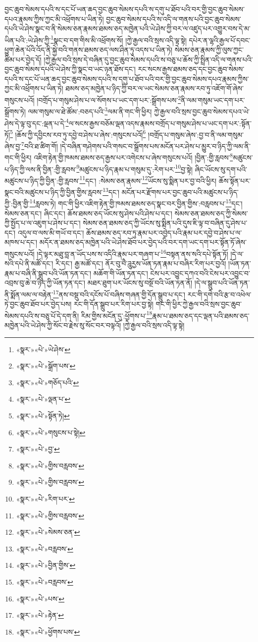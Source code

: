 བྱང་ཆུབ་སེམས་དཔའི་ས་དང་པོ་ཡན་ཆད་བྱང་ཆུབ་སེམས་དཔའི་ས་དགུ་པ་ཐོབ་པའི་བར་གྱི་བྱང་ཆུབ་སེམས་དཔའ་རྣམས་ཀྱིས་ཀྱང་མི་འཕྲོགས་པ་ཡིན་ཏེ། བྱང་ཆུབ་སེམས་དཔའི་ས་འདི་ལ་གནས་པའི་བྱང་ཆུབ་སེམས་དཔའི་ཡེ་ཤེས་སྣང་བ་ནི་སེམས་ཅན་རྣམས་ཐམས་ཅད་མཁྱེན་པའི་ཡེ་ཤེས་ཀྱི་བར་ལ་འཛུད་པར་འགྱུར་བས་དེ་མ་ཡིན་པའི་:ཡེ་ཤེས་ཀྱི་\footnote{«སྣར་»«པེ་»ཡེ་ཤེས་}སྣང་བ་དག་གིས་མི་འཕྲོགས་སོ། །ཀྱེ་རྒྱལ་བའི་སྲས་འདི་ལྟ་སྟེ། དཔེར་ན་ལྷའི་རྒྱལ་པོ་དབང་ཕྱུག་ཆེན་པོའི་འོད་ནི་སྐྱེ་བའི་གནས་ཐམས་ཅད་ལས་ཤིན་ཏུ་འདས་པ་ཡིན་ཏེ། སེམས་ཅན་རྣམས་ཀྱི་ལུས་ཀྱང་ཚིམ་པར་བྱེད་དོ། །ཀྱེ་རྒྱལ་བའི་སྲས་དེ་བཞིན་དུ་བྱང་ཆུབ་སེམས་དཔའི་ས་བཅུ་པ་ཆོས་ཀྱི་སྤྲིན་འདི་ལ་གནས་པའི་བྱང་ཆུབ་སེམས་དཔའི་ཡེ་ཤེས་ཀྱི་སྣང་བ་ཡང་ཉན་ཐོས་དང་། རང་སངས་རྒྱས་ཐམས་ཅད་དང་བྱང་ཆུབ་སེམས་དཔའི་ས་དང་པོ་ཡན་ཆད་བྱང་ཆུབ་སེམས་དཔའི་ས་དགུ་པ་ཐོབ་པའི་བར་གྱི་བྱང་ཆུབ་སེམས་དཔའ་རྣམས་ཀྱིས་ཀྱང་མི་འཕྲོགས་པ་ཡིན་ཏེ། ཐམས་ཅད་མཁྱེན་པ་ཉིད་ཀྱི་བར་ལ་ཡང་སེམས་ཅན་རྣམས་རབ་ཏུ་འཇོག་གོ་ཞེས་གསུངས་པའོ། །བགྲོད་པ་གསུམ་ཤེས་པ་ལ་སོགས་པ་ཡང་དག་པར་:སྒྲོགས་པས་\footnote{«སྣར་»«པེ་»སྒྲོག་པས་}ནི་ལམ་གསུམ་ཡང་དག་པར་སྒྲོགས་ཏེ། ལམ་གསུམ་ལ་ཐེ་ཚོམ་:བཅད་པའི་\footnote{«སྣར་»«པེ་»གཅོད་པའི་}ལམ་ནི་གང་གི་ཕྱིར། ཀྱེ་རྒྱལ་བའི་སྲས་བྱང་ཆུབ་སེམས་དཔའ་ཡེ་ཤེས་དེ་ལྟ་བུ་དང་:ལྡན་པ་དེ་\footnote{«སྣར་»«པེ་»ལྡན་པ་}ལ་སངས་རྒྱས་བཅོམ་ལྡན་འདས་རྣམས་བགྲོད་པ་གསུམ་ཤེས་པ་ཡང་དག་པར་:སྟོན་ཏོ།\footnote{«སྣར་»«པེ་»སྟོན་ཏེ།} །ཆོས་ཀྱི་དབྱིངས་རབ་ཏུ་དབྱེ་བ་ཤེས་པ་ཞེས་:གསུངས་པའོ།\footnote{«སྣར་»«པེ་»གསུངས་པ་སྟེ།} །བགྲོད་པ་གསུམ་ཞེས་:བྱ་བ་ནི་ལམ་གསུམ་ཞེས་བྱ་\footnote{«སྣར་»«པེ་»བྱ་}བའི་ཐ་ཚིག་གོ། །དེ་བཞིན་གཤེགས་པའི་གསང་བ་སྒྲོགས་པས་མངོན་པར་ཤེས་པ་མྱུར་བ་ཉིད་ཀྱི་ལམ་ནི་གང་གི་ཕྱིར། འཇིག་རྟེན་གྱི་ཁམས་ཐམས་ཅད་རྒྱས་པར་འགེངས་པ་ཞེས་གསུངས་པའོ། །བྱིན་:གྱི་རླབས་\footnote{«སྣར་»«པེ་»གྱིས་བརླབས་}མཚུངས་པ་ཉིད་ཀྱི་ལས་ནི་བྱིན་:གྱི་རླབས་\footnote{«སྣར་»«པེ་»གྱིས་བརླབས་}མཚུངས་པ་ཉིད་རྣམ་པ་གསུམ་དུ་:རེག་པར་\footnote{«སྣར་»«པེ་»རིག་པར་}བྱ་སྟེ། ཞིང་ཡོངས་སུ་དག་པའི་མཚུངས་པ་ཉིད་ཀྱི་བྱིན་:གྱི་རླབས་\footnote{«སྣར་»«པེ་»གྱིས་བརླབས་}དང་། :སེམས་ཅན་རྣམས་\footnote{«སྣར་»«པེ་»སེམས་ཅན་}ཡོངས་སུ་སྨིན་པར་བྱ་བའི་ཕྱིར། ཆོས་སྟོན་པར་སྣང་བའི་མཚུངས་པ་ཉིད་ཀྱི་བྱིན་གྱིས་རླབས་\footnote{«སྣར་»«པེ་»བརླབས་}དང་། མངོན་པར་རྫོགས་པར་བྱང་ཆུབ་པའི་མཚུངས་པ་ཉིད་ཀྱི་:བྱིན་གྱི་\footnote{«སྣར་»«པེ་»བྱིན་གྱིས་}རླབས་ཏེ། གང་གི་ཕྱིར་འཇིག་རྟེན་གྱི་ཁམས་ཐམས་ཅད་སྣང་བར་བྱིན་གྱིས་:བརླབས་པ་\footnote{«སྣར་»«པེ་»བརླབས་}དང་། སེམས་ཅན་དང་། ཞིང་དང་། ཆོས་ཐམས་ཅད་ཡོངས་སུ་ཤེས་པའི་ཤེས་པ་དང་། སེམས་ཅན་ཐམས་ཅད་ཀྱི་སེམས་ཀྱི་སྤྱོད་པ་ལ་འཇུག་པ་ཤེས་པ་དང་། སེམས་ཅན་ཐམས་ཅད་ཀྱི་ཡོངས་སུ་སྨིན་པའི་དུས་ཇི་ལྟ་བ་བཞིན་དུ་ཤེས་པ་དང་། འདུལ་བ་ལས་མི་གཡོ་བ་དང་། ཆོས་ཐམས་ཅད་རབ་ཏུ་རྣམ་པར་འབྱེད་པའི་རྣམ་པར་དབྱེ་བ་ཤེས་པ་ལ་མཁས་པ་དང་། མདོར་ན་ཐམས་ཅད་མཁྱེན་པའི་ཡེ་ཤེས་ཐོབ་པར་བྱེད་པའི་བར་དག་ཡང་དག་པར་སྟོན་ཏོ་ཞེས་གསུངས་པའོ། །དེ་ལྟར་མཐུ་བླ་ན་ཡོད་པས་ས་འདིའི་རྣམ་པར་གཞག་པ་\footnote{«སྣར་»«པེ་»པས་}བསྟན་ནས་སའི་དཔེ་སྟོན་ཏོ། །དེ་ལ་སའི་དཔེ་ནི་མཚོ་དང་། རི་དང་། རྒྱ་མཚོ་དང་། ནོར་བུ་བཻ་ཌཱུརྱས་ཡོན་ཏན་རྣམ་པ་བཞིར་རིག་པར་བྱའོ། །ཡོན་ཏན་རྣམ་པ་བཞི་ནི་སྒྲུབ་པའི་ཡོན་ཏན་དང་། མཆོག་གི་ཡོན་ཏན་དང་། ངེས་པར་འབྱུང་དཀའ་བའི་ངེས་པར་འབྱུང་བ་འབྲས་བུ་ཆེ་བ་ཉིད་ཀྱི་ཡོན་ཏན་དང་། མཐར་ཐུག་པར་ཡོངས་སུ་བསྔོ་བའི་ཡོན་ཏན་ནོ། །དེ་ལ་སྒྲུབ་པའི་ཡོན་ཏན་ནི་སྨོན་ལམ་ལ་བརྟེན་\footnote{«སྣར་»«པེ་»རྟེན་}ནས་བསྡུ་བའི་དངོས་པོ་བཞིས་གཞན་གྱི་དོན་སྒྲུབ་པ་དང་། རང་གི་དགེ་བའི་རྩ་བ་འཕེལ་ཏེ་བྱང་ཆུབ་ཐོབ་པར་བྱེད་པས། རང་གི་དོན་སྒྲུབ་པར་རིག་པར་བྱ་སྟེ། གང་གི་ཕྱིར་ཀྱེ་རྒྱལ་བའི་སྲས་བྱང་ཆུབ་སེམས་དཔའི་ས་བཅུ་པོ་དེ་དག་ནི། རིམ་གྱིས་མངོན་དུ་:ཕྱོགས་པ་\footnote{«སྣར་»«པེ་»ཕྱོགས་པས་}རྣམ་པ་ཐམས་ཅད་དང་ལྡན་པའི་ཐམས་ཅད་མཁྱེན་པའི་ཡེ་ཤེས་ཀྱི་སོང་བ་རྗེས་སུ་སོང་བར་བལྟའོ། །ཀྱེ་རྒྱལ་བའི་སྲས་འདི་ལྟ་སྟེ། 